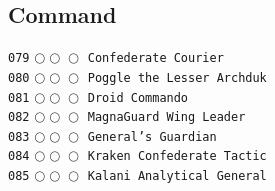 \documentclass[a4paper,landscape]{article}
\begin{document}
\begin{multicols*}{5}
\section{Command} 
\vspace{-2mm} 
\texttt{079} \(\bigcirc\!\bigcirc\!\bigcirc\)  \texttt{Confederate Courier} \vspace{-0.3mm}\\ 
\texttt{080} \(\bigcirc\!\bigcirc\!\bigcirc\)  \texttt{Poggle the Lesser Archduk} \vspace{-0.3mm}\\ 
\texttt{081} \(\bigcirc\!\bigcirc\!\bigcirc\)  \texttt{Droid Commando} \vspace{-0.3mm}\\ 
\texttt{082} \(\bigcirc\!\bigcirc\!\bigcirc\)  \texttt{MagnaGuard Wing Leader} \vspace{-0.3mm}\\ 
\texttt{083} \(\bigcirc\!\bigcirc\!\bigcirc\)  \texttt{General's Guardian} \vspace{-0.3mm}\\ 
\texttt{084} \(\bigcirc\!\bigcirc\!\bigcirc\)  \texttt{Kraken Confederate Tactic} \vspace{-0.3mm}\\ 
\texttt{085} \(\bigcirc\!\bigcirc\!\bigcirc\)  \texttt{Kalani Analytical General} \vspace{-0.3mm}\\ 

\end{multicols*}
\end{document}
